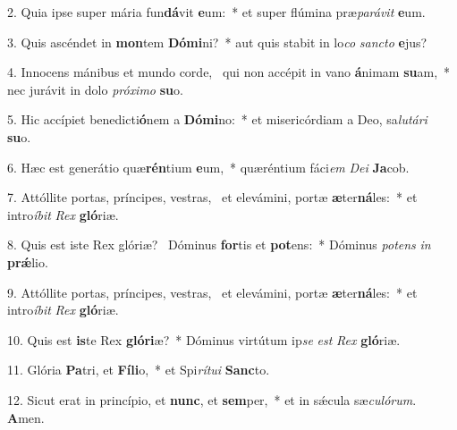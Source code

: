 2. Quia ipse super mária fun\textbf{dá}vit \textbf{e}um:~*  et super flúmina præ\textit{pa}\textit{rá}\textit{vit} \textbf{e}um.\

3. Quis ascéndet in \textbf{mon}tem \textbf{Dó}\textbf{mi}ni?~*  aut quis stabit in lo\textit{co} \textit{sanc}\textit{to} \textbf{e}jus?\

4. Innocens mánibus et mundo corde, \dag\  qui non accépit in vano \textbf{á}nimam \textbf{su}am,~*  nec jurávit in dolo \textit{pró}\textit{xi}\textit{mo} \textbf{su}o.\

5. Hic accípiet benedicti\textbf{ó}nem a \textbf{Dó}\textbf{mi}no:~*  et misericórdiam a Deo, sa\textit{lu}\textit{tá}\textit{ri} \textbf{su}o.\

6. Hæc est generátio quæ\textbf{rén}tium \textbf{e}um,~*  quæréntium fáci\textit{em} \textit{De}\textit{i} \textbf{Ja}cob.\

7. Attóllite portas, príncipes, vestras, \dag\  et elevámini, portæ \textbf{æ}ter\textbf{ná}les:~*  et intro\textit{í}\textit{bit} \textit{Rex} \textbf{gló}riæ.\

8. Quis est iste Rex glóriæ? \dag\  Dóminus \textbf{for}tis et \textbf{pot}ens:~*  Dóminus \textit{pot}\textit{ens} \textit{in} \textbf{prǽ}lio.\

9. Attóllite portas, príncipes, vestras, \dag\  et elevámini, portæ \textbf{æ}ter\textbf{ná}les:~*  et intro\textit{í}\textit{bit} \textit{Rex} \textbf{gló}riæ.\

10. Quis est \textbf{is}te Rex \textbf{gló}\textbf{ri}æ?~*  Dóminus virtútum ip\textit{se} \textit{est} \textit{Rex} \textbf{gló}riæ.\

11. Glória \textbf{Pa}tri, et \textbf{Fí}\textbf{li}o,~*  et Spi\textit{rí}\textit{tu}\textit{i} \textbf{Sanc}to.\

12. Sicut erat in princípio, et \textbf{nunc}, et \textbf{sem}per,~*  et in sǽcula sæ\textit{cu}\textit{ló}\textit{rum}. \textbf{A}men.\

